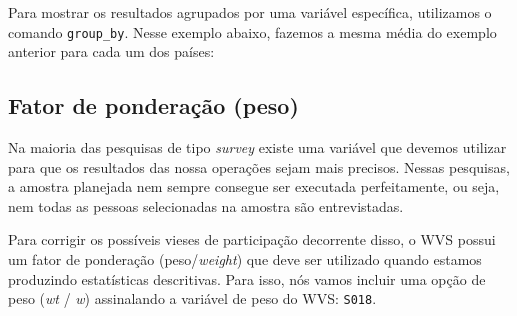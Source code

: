 \documentclass[
  10pt,
  brazil,
  a4paper,
  twoside, notitlepage, openright]{book}
\newenvironment{Shaded}{\begin{snugshade}}{\end{snugshade}}
\newcommand{\CommentTok}[1]{\textcolor[rgb]{0.56,0.35,0.01}{\textit{#1}}}
\newcommand{\DataTypeTok}[1]{\textcolor[rgb]{0.13,0.29,0.53}{#1}}
\newcommand{\KeywordTok}[1]{\textcolor[rgb]{0.13,0.29,0.53}{\textbf{#1}}}
\newcommand{\NormalTok}[1]{#1}
\newcommand{\OperatorTok}[1]{\textcolor[rgb]{0.81,0.36,0.00}{\textbf{#1}}}
\newcommand{\OtherTok}[1]{\textcolor[rgb]{0.56,0.35,0.01}{#1}}
\newcommand{\StringTok}[1]{\textcolor[rgb]{0.31,0.60,0.02}{#1}}
\begin{document}
Para mostrar os resultados agrupados por uma variável específica, utilizamos o comando \texttt{group\_by}. Nesse exemplo abaixo, fazemos a mesma média do exemplo anterior para cada um dos países:

\begin{Shaded}
\end{Shaded}

\hypertarget{fator-de-ponderauxe7uxe3o-peso}{%
\subsection{Fator de ponderação (peso)}\label{fator-de-ponderauxe7uxe3o-peso}}

Na maioria das pesquisas de tipo \emph{survey} existe uma variável que devemos utilizar para que os resultados das nossa operações sejam mais precisos. Nessas pesquisas, a amostra planejada nem sempre consegue ser executada perfeitamente, ou seja, nem todas as pessoas selecionadas na amostra são entrevistadas.

Para corrigir os possíveis vieses de participação decorrente disso, o WVS possui um fator de ponderação (peso/\emph{weight}) que deve ser utilizado quando estamos produzindo estatísticas descritivas. Para isso, nós vamos incluir uma opção de peso (\emph{wt} / \emph{w}) assinalando a variável de peso do WVS: \texttt{S018}.

\begin{Shaded}
\end{Shaded}
\end{document}
